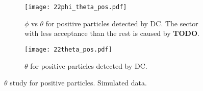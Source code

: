     \begin{figure}
        \centering
        \begin{subfigure}[b]{\textwidth}
            \centering
            \texttt{[image: 22phi\_theta\_pos.pdf]}
            \caption[$\phi$ vs $\theta$ for positive particles]
            {$\phi$ vs $\theta$ for positive particles detected by DC.
            The sector with less acceptance than the rest is caused by \textbf{TODO}.}
            \label{fig::14.22::phi_theta_pos}
        \end{subfigure}
        \begin{subfigure}[b]{\textwidth}
            \centering
            \texttt{[image: 22theta\_pos.pdf]}
            \caption[$\theta$ for positive particles]
            {$\theta$ for positive particles detected by DC.}
            \label{fig::14.22::theta_pos}
        \end{subfigure}
        \caption[$\theta$ study for positive particles]
        {$\theta$ study for positive particles.
        Simulated data.}
        \label{fig::14.22::theta_study_pos}
    \end{figure}

    \pagebreak
